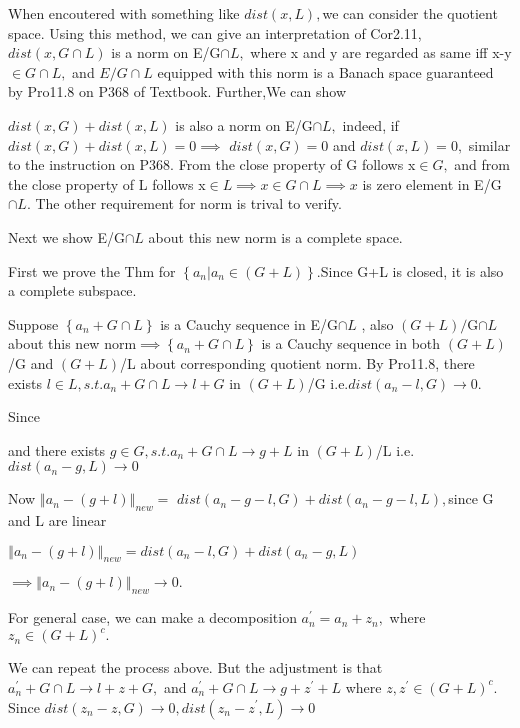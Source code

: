 \documentclass{article}
\begin{document}
When encoutered with something like $dist\left( x,L\right) ,$we can consider
the quotient space. Using this method, we can give an interpretation of
Cor2.11, $dist\left( x,G\cap L\right) $ is a norm on E/G$\cap L,$ where x
and y are regarded as same iff x-y$\in G\cap L,$ and $E/G\cap L$ equipped
with this norm is a Banach space guaranteed by Pro11.8 on P368 of Textbook.
Further,We can show 

$dist\left( x,G\right) +dist\left( x,L\right) $ is also a norm on E/G$\cap L,
$ indeed, if  $dist\left( x,G\right) +dist\left( x,L\right) =0\implies $%
\qquad $dist\left( x,G\right) =0$ and $dist\left( x,L\right) =0,$ similar to
the instruction on P368. From the close property of G follows x$\in G,$ and
from the close property of L follows x$\in L\implies x\in G\cap L\implies x$
is zero element in  E/G$\cap L.$ The other requirement for norm is trival to
verify.

Next we show E/G$\cap L$ about this new norm is a complete space. 

\bigskip First we prove the Thm for $\left\{ a_{n}|a_{n}\in \left(
G+L\right) \right\} $.Since G+L is closed, it is also a complete subspace.

Suppose $\left\{ a_{n}+G\cap L\right\} $ is a Cauchy sequence in E/G$\cap L$
, also $\left( G+L\right) /$G$\cap L$ about this new norm$\implies \left\{
a_{n}+G\cap L\right\} $ is a Cauchy sequence in both $\left( G+L\right) $/G
and $\left( G+L\right) $/L about corresponding quotient norm. By Pro11.8,
there exists $l\in L,s.t.a_{n}+G\cap L\rightarrow l+G$ in $\left( G+L\right) 
$/G i.e.$dist\left( a_{n}-l,G\right) \rightarrow 0.$

Since 

and  there exists $g\in G,s.t.a_{n}+G\cap L\rightarrow g+L$ in $\left(
G+L\right) $/L i.e.$dist\left( a_{n}-g,L\right) \rightarrow 0$

Now $\left\Vert a_{n}-\left( g+l\right) \right\Vert _{new}=$ $dist\left(
a_{n}-g-l,G\right) +dist\left( a_{n}-g-l,L\right) ,$since G and L are linear

$\left\Vert a_{n}-\left( g+l\right) \right\Vert _{new}=dist\left(
a_{n}-l,G\right) +dist\left( a_{n}-g,L\right) $

$\implies \left\Vert a_{n}-\left( g+l\right) \right\Vert _{new}\rightarrow 0.
$

For general case, we can make a decomposition $a_{n}^{\prime }=a_{n}+z_{n},$%
where $z_{n}\in \left( G+L\right) ^{c}.$

We can repeat the process above. But the adjustment is that $a_{n}^{\prime
}+G\cap L\rightarrow l+z+G,$ and $a_{n}^{\prime }+G\cap L\rightarrow
g+z^{\prime }+L$ where $z,z^{\prime }\in \left( G+L\right) ^{c}.$Since $%
dist\left( z_{n}-z,G\right) \rightarrow 0,dist\left( z_{n}-z^{\prime
},L\right) \rightarrow 0$
\end{document}
